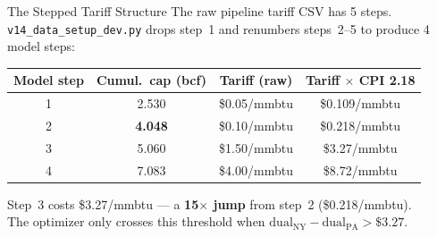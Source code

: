 \documentclass[aspectratio=169, 11pt]{beamer}
\begin{document}
\begin{frame}{The Stepped Tariff Structure}
  The raw pipeline tariff CSV has 5 steps. \texttt{v14\_data\_setup\_dev.py} drops step~1 and renumbers steps~2--5 to produce 4 model steps:

  \vspace{0.5em}
  \begin{table}
    \centering
    \begin{tabular}{cccc}
      \toprule
      \textbf{Model step} & \textbf{Cumul.\ cap (bcf)} & \textbf{Tariff (raw)} & \textbf{Tariff $\times$ CPI 2.18} \\
      \midrule
      1 & 2.530 & \$0.05/mmbtu & \$0.109/mmbtu \\
      2 & \textbf{4.048} & \$0.10/mmbtu & \$0.218/mmbtu \\
      \rowcolor{gray!15}
      3 & 5.060 & \alert{\$1.50/mmbtu} & \alert{\$3.27/mmbtu} \\
      4 & 7.083 & \$4.00/mmbtu & \$8.72/mmbtu \\
      \bottomrule
    \end{tabular}
  \end{table}

  \vspace{0.5em}
  Step~3 costs \alert{\$3.27/mmbtu} --- a \textbf{15$\times$ jump} from step~2 (\$0.218/mmbtu). \\
  The optimizer only crosses this threshold when $\text{dual}_\text{NY} - \text{dual}_\text{PA} > \$3.27$.
\end{frame}
\end{document}
